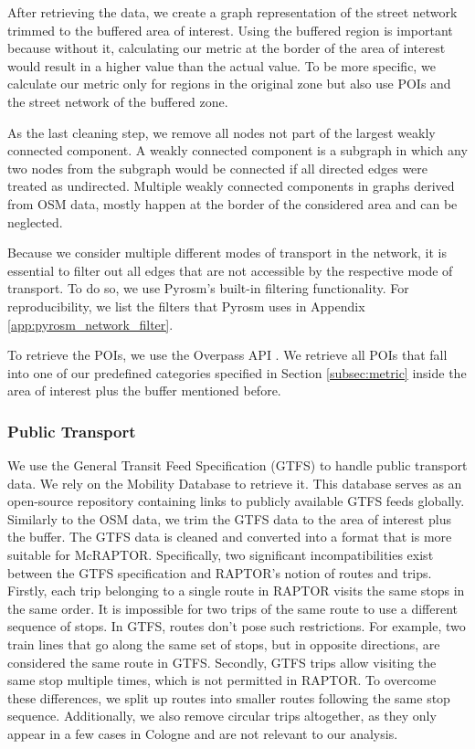 After retrieving the data, we create a graph representation of the street network trimmed to the buffered area of interest.
Using the buffered region is important because without it, calculating our metric at the border of the area of interest would result in a higher value than the actual value.
To be more specific, we calculate our metric only for regions in the original zone but also use POIs and the street network of the buffered zone.

As the last cleaning step, we remove all nodes not part of the largest weakly connected component.
A weakly connected component is a subgraph in which any two nodes from the subgraph would be connected if all directed edges were treated as undirected.
Multiple weakly connected components in graphs derived from OSM data, mostly happen at the border of the considered area and can be neglected.

Because we consider multiple different modes of transport in the network, it is essential to filter out all edges that are not accessible by the respective mode of transport.
To do so, we use Pyrosm's built-in filtering functionality.
For reproducibility, we list the filters that Pyrosm uses in Appendix \ref{app:pyrosm_network_filter}.

To retrieve the POIs, we use the Overpass API .
We retrieve all POIs that fall into one of our predefined categories specified in Section \ref{subsec:metric} inside the area of interest plus the buffer mentioned before.

\subsubsection{Public Transport}
\label{subs:public_transport}

We use the General Transit Feed Specification (GTFS)  to handle public transport data.
We rely on the Mobility Database  to retrieve it.
This database serves as an open-source repository containing links to publicly available GTFS feeds globally.
Similarly to the OSM data, we trim the GTFS data to the area of interest plus the buffer.
The GTFS data is cleaned and converted into a format that is more suitable for McRAPTOR.
Specifically, two significant incompatibilities exist between the GTFS specification and RAPTOR's notion of routes and trips.
Firstly, each trip belonging to a single route in RAPTOR visits the same stops in the same order.
It is impossible for two trips of the same route to use a different sequence of stops.
In GTFS, routes don't pose such restrictions.
For example, two train lines that go along the same set of stops, but in opposite directions, are considered the same route in GTFS.
Secondly, GTFS trips allow visiting the same stop multiple times, which is not permitted in RAPTOR.
To overcome these differences, we split up routes into smaller routes following the same stop sequence.
Additionally, we also remove circular trips altogether, as they only appear in a few cases in Cologne and are not relevant to our analysis.

